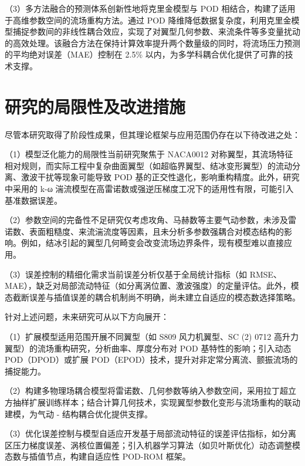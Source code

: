 （3）多方法融合的预测体系创新性地将克里金模型与 POD 相结合，构建了适用于高维参数空间的流场重构方法。通过 POD 降维降低数据复杂度，利用克里金模型捕捉参数间的非线性耦合效应，实现了对翼型几何参数、来流条件等多变量扰动的高效处理。该融合方法在保持计算效率提升两个数量级的同时，将流场压力预测的平均绝对误差（MAE）控制在 2.5\% 以内，为多学科耦合优化提供了可靠的技术支撑。

\section{研究的局限性及改进措施}
尽管本研究取得了阶段性成果，但其理论框架与应用范围仍存在以下待改进之处：

（1）模型泛化能力的局限性当前研究聚焦于 NACA0012 对称翼型，其流场特征相对规则，而实际工程中复杂曲面翼型（如超临界翼型、结冰变形翼型）的流动分离、激波干扰等现象可能导致 POD 基的正交性退化，影响重构精度。此外，研究中采用的 k-ω 湍流模型在高雷诺数或强逆压梯度工况下的适用性有限，可能引入基准数据误差。

（2）参数空间的完备性不足研究仅考虑攻角、马赫数等主要气动参数，未涉及雷诺数、表面粗糙度、来流湍流度等因素，且未分析多参数强耦合对模态结构的影响。例如，结冰引起的翼型几何畸变会改变流场边界条件，现有模型难以直接应用。

（3）误差控制的精细化需求当前误差分析仅基于全局统计指标（如 RMSE、MAE），缺乏对局部流动特征（如分离涡位置、激波强度）的定量评估。此外，模态截断误差与插值误差的耦合机制尚不明确，尚未建立自适应的模态数选择策略。

针对上述问题，未来研究可从以下方向展开：

（1）扩展模型适用范围开展不同翼型（如 S809 风力机翼型、SC (2) 0712 高升力翼型）的流场重构研究，分析曲率、厚度分布对 POD 基特性的影响；引入动态 POD（DPOD）或扩展 POD（EPOD）技术，提升对非定常分离流、颤振流场的捕捉能力。​

（2）构建多物理场耦合模型将雷诺数、几何参数等纳入参数空间，采用拉丁超立方抽样扩展训练样本；结合计算几何技术，实现翼型参数化变形与流场重构的联动建模，为气动 - 结构耦合优化提供支撑。​

（3）优化误差控制与模型自适应开发基于局部流动特征的误差评估指标，如分离区压力梯度误差、涡核位置偏差；引入机器学习算法（如贝叶斯优化）动态调整模态数与插值节点，构建自适应性 POD-ROM 框架。
